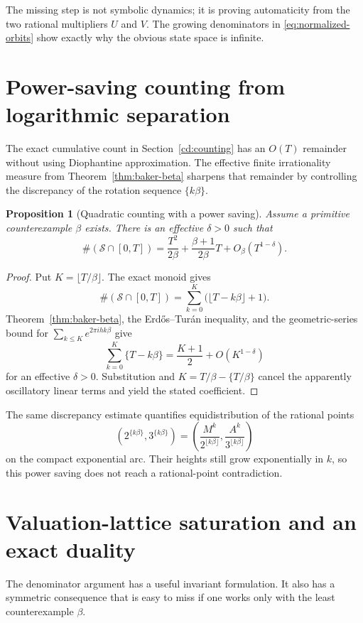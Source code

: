 \documentclass[11pt,oneside]{article}
\newtheorem{proposition}[theorem]{Proposition}
\theoremstyle{definition}
\theoremstyle{remark}
\newcommand{\Sol}{\mathcal S}
\begin{document}
The missing step is not symbolic dynamics; it is proving automaticity from the two rational
multipliers $U$ and $V$.  The growing denominators in \eqref{eq:normalized-orbits} show exactly why the
obvious state space is infinite.

\section{Power-saving counting from logarithmic separation}

The exact cumulative count in Section~\ref{cd:counting} has an $O(T)$ remainder without
using Diophantine approximation.  The effective finite irrationality measure from
Theorem~\ref{thm:baker-beta} sharpens that remainder by controlling the discrepancy of
the rotation sequence $\{k\beta\}$.

\begin{proposition}[Quadratic counting with a power saving]\label{prop:count}
Assume a primitive counterexample $\beta$ exists.  There is an effective $\delta>0$ such
that
\[
 \#(\Sol\cap[0,T])=\frac{T^2}{2\beta}
 +\frac{\beta+1}{2\beta}T+O_\beta(T^{1-\delta}).
\]
\end{proposition}
\begin{proof}
Put $K=\lfloor T/\beta\rfloor$.  The exact monoid gives
\[
 \#(\Sol\cap[0,T])
 =\sum_{k=0}^{K}\bigl(\lfloor T-k\beta\rfloor+1\bigr).
\]
Theorem~\ref{thm:baker-beta}, the Erd\H{o}s--Tur\'an inequality, and the geometric-series
bound for $\sum_{k\le K}e^{2\pi i h k\beta}$ give
\[
 \sum_{k=0}^{K}\{T-k\beta\}=\frac{K+1}{2}+O(K^{1-\delta})
\]
for an effective $\delta>0$.  Substitution and
$K=T/\beta-\{T/\beta\}$ cancel the apparently oscillatory linear terms and yield the
stated coefficient.
\end{proof}

The same discrepancy estimate quantifies equidistribution of the rational points
\[
 \left(2^{\{k\beta\}},3^{\{k\beta\}}\right)
 =\left(\frac{M^k}{2^{\lfloor k\beta\rfloor}},
          \frac{A^k}{3^{\lfloor k\beta\rfloor}}\right)
\]
on the compact exponential arc.  Their heights still grow exponentially in $k$, so this
power saving does not reach a rational-point contradiction.

\section{Valuation-lattice saturation and an exact duality}
\label{sec:saturation-duality}

The denominator argument has a useful invariant formulation.  It also has a
symmetric consequence that is easy to miss if one works only with the least
counterexample $\beta$.
\end{document}
